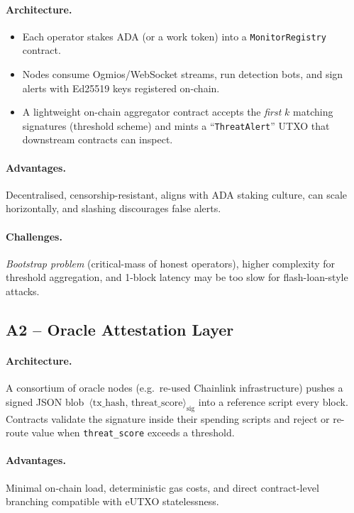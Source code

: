 \documentclass{scrreport}
\begin{document}
\paragraph{Architecture.}
\begin{itemize}
  \item Each operator stakes ADA (or a work token) into a \texttt{MonitorRegistry} contract.
  \item Nodes consume Ogmios/WebSocket streams, run detection bots, and sign
        alerts with Ed25519 keys registered on-chain.
  \item A lightweight on-chain aggregator contract accepts the \emph{first} $k$ matching
        signatures (threshold scheme) and mints a “\texttt{ThreatAlert}” UTXO that
        downstream contracts can inspect.
\end{itemize}

\paragraph{Advantages.}
Decentralised, censorship-resistant, aligns with ADA staking culture,
can scale horizontally, and slashing discourages false alerts.

\paragraph{Challenges.}
\emph{Bootstrap problem} (critical-mass of honest operators), higher
complexity for threshold aggregation, and 1-block latency may be too slow
for flash-loan-style attacks.

\subsection{A2 – Oracle Attestation Layer}

\paragraph{Architecture.}
A consortium of oracle nodes (e.g.\ re-used Chainlink infrastructure) 
pushes a signed JSON blob~$\langle\text{tx\_hash},\,
\text{threat\_score}\rangle_{\text{sig}}$ into a reference script every
block.  Contracts validate the signature inside their spending scripts and
reject or re-route value when \texttt{threat\_score} exceeds a threshold.

\paragraph{Advantages.}
Minimal on-chain load, deterministic gas costs, and direct
contract-level branching compatible with eUTXO statelessness.
\end{document}
